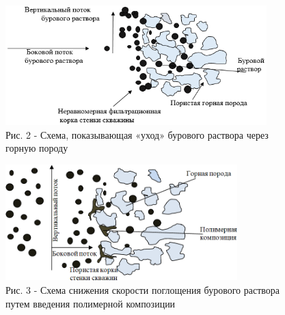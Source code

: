 \begin{figure}[H]
	\centering
	\includegraphics[width=0.9\textwidth]{assets/1262.1}
	\caption*{Рис. 2 - Схема, показывающая «уход» бурового раствора через горную породу}
\end{figure}

\begin{figure}[H]
	\centering
	\includegraphics[width=0.8\textwidth]{assets/1263}
	\caption*{Рис. 3 - Схема снижения скорости поглощения бурового раствора путем введения полимерной композиции}
\end{figure}

